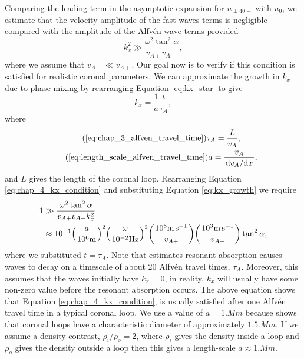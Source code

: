 Comparing the leading term in the asymptotic expansion for $u_{\perp40-}$ with $u_0$, we estimate that the velocity amplitude of the fast waves terms is negligible compared with the amplitude of the Alfv\'en wave terms provided
\begin{equation}
    \label{eq:chap_4_kx_condition}
    k_x^2 \gg \frac{\omega^2\tan^2\alpha}{v_{A+}v_{A-}},
\end{equation}
where we assume that $v_{A-}\ll v_{A+}$. Our goal now is to verify if this condition is satisfied for realistic coronal parameters. We can approximate the growth in $k_x$ due to phase mixing by rearranging Equation \eqref{eq:kx_star} to give
\begin{equation}
    \label{eq:kx_growth}
    k_x = \frac{1}{a}\frac{t}{\tau_A},
\end{equation}
where 
\begin{gather}
    \tag{\ref{eq:chap_3_alfven_travel_time}}
    \tau_A = \frac{L}{v_A}, \\
    \tag{\ref{eq:length_scale_alfven_travel_time}}
    a = \frac{v_A}{\dv*{v_A}{x}},
\end{gather}
and $L$ gives the length of the coronal loop. Rearranging Equation \eqref{eq:chap_4_kx_condition} and substituting Equation \eqref{eq:kx_growth}  we require
\begin{equation}
    \begin{aligned}
        1 &\gg \frac{\omega^2 \tan^2\alpha}{v_{A+}v_{A-}k_x^2} \\
         &\approx 10^{-1}\qty(\frac{a}{10^6\si{.m}})^2\qty(\frac{\omega}{10^{-2}\si{.Hz}})^2\qty(\frac{10^6\si{.m.s^{-1}}}{v_{A+}})\qty(\frac{10^3\si{.m.s^{-1}}}{v_{A-}})\tan^2\alpha,
    \end{aligned}
\end{equation}
where we substituted $t=\tau_A$. Note that \citet{Roberts2019} estimates resonant absorption causes waves to decay on a timescale of about 20 Alfv\'en travel times, $\tau_A$. Moreover, this assumes that the waves initially have $k_x=0$, in reality, $k_x$ will usually have some non-zero value before the resonant absorption occurs. The above equation shows that Equation \eqref{eq:chap_4_kx_condition}, is usually satisfied after one Alfv\'en travel time in a typical coronal loop. We use a value of $a=1\si{.Mm}$ because \citet{Klimchuk2015} shows that coronal loops have a characteristic diameter of approximately $1.5\si{.Mm}$. If we assume a density contrast, $\rho_i/\rho_o=2$, \citep{Hood2013,Pascoe2013} where $\rho_i$ gives the density inside a loop and $\rho_o$ gives the density outside a loop then this gives a length-scale $a\approx1\si{.Mm}$.

